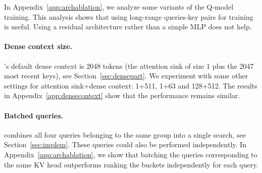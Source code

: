 In Appendix~\ref{app:archablation}, we analyze some variants of the Q-model training. 
This analysis shows that using long-range queries-key pairs for training is useful. 
Using a residual architecture rather than a simple MLP does not help. 

\paragraph{Dense context size.}

\OURS's default dense context is 2048 tokens (the attention sink of size 1 plus the 2047 most recent keys), see Section~\ref{sec:densepart}. 
We experiment with some other settings for attention sink+dense context: 1+511, 1+63 and 128+512. 
The results in Appendix~\ref{app:densecontext} show that the performance remains similar. 

\paragraph{Batched queries.}

\OURS combines all four queries belonging to the same group into a single search, see Section~\ref{sec:implem}. 
These queries could also be performed independently. In Appendix~\ref{app:archablation}, we show that batching the queries corresponding to the same KV head outperforms ranking the buckets independently for each query.


\balance



%

%

%

%

%

